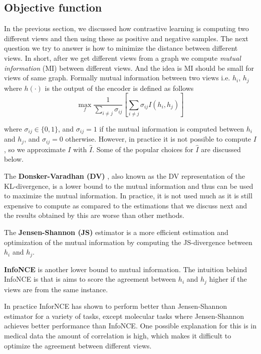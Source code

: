 \documentclass{article}
\begin{document}
\subsection{Objective function}
In the previous section, we discussed how contrastive learning is computing two different views and then using these as positive and negative samples. The next question we try to answer is how to minimize the distance between different views. In short, after we get different views from a graph we compute \textit{mutual information} (MI) between different views. And the idea is MI should be small for views of same graph. Formally mutual information between two views i.e. $h_i$, $h_j$ where $h(\cdot)$ is the output of the encoder is defined as follows
\begin{equation}
    \max_{f} \frac{1}{\sum_{i\neq j} \sigma_{ij}} \left[ \sum_{i \neq j} \sigma_{ij}\textit{I}(h_i, h_j) \right]
\end{equation}

where $\sigma_{ij} \in \{0, 1\}$, and $\sigma_{ij}=1$ if the mutual information is computed between $h_i$ and $h_j$, and $\sigma_{ij}=0$ otherwise. However, in practice it is not possible to compute $\textit{I}$, so we approximate $\textit{I}$ with $\hat{\textit{I}}$. Some of the popular choices for $\hat{\textit{I}}$ are discussed below.

The \textbf{Donsker-Varadhan (DV)} \citep{cite20}, also known as the DV representation of the KL-divergence, is a lower bound to the mutual information and thus can be used to maximize the mutual information. In practice, it is not used much as it is still expensive to compute as compared to the estimations that we discuss next and the results obtained by this are worse than other methods. 

The \textbf{Jensen-Shannon (JS)} estimator is a more efficient estimation and optimization of the mutual information by computing the JS-divergence between $h_i$ and $h_j$.

\textbf{InfoNCE} is another lower bound to mutual information. The intuition behind InfoNCE is that is aims to score the agreement between $h_i$ and $h_j$ higher if the views are from the same instance.

In practice InforNCE has shown to perform better than Jensen-Shannon estimator for a variety of tasks, except molecular tasks where Jensen-Shannon achieves better performance than InfoNCE. One possible explanation for this is in medical data the amount of correlation is high, which makes it difficult to optimize the agreement between different views.
\end{document}
